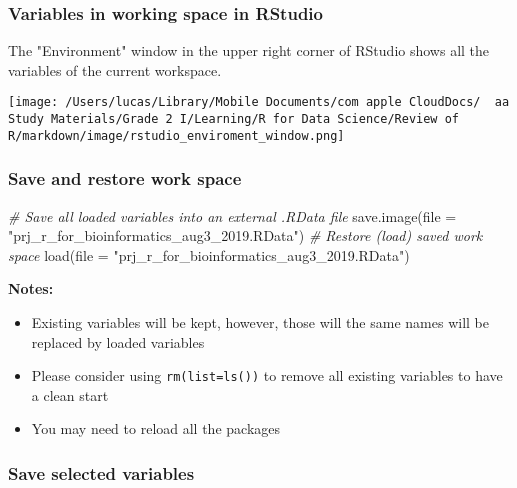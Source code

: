 \documentclass[
]{article}
\let\oldincludegraphics\includegraphics
\renewcommand{\includegraphics}[2][]{\begin{center}\oldincludegraphics[#1]{#2}\end{center}}
\newenvironment{Shaded}{}{}
\newcommand{\AttributeTok}[1]{\textcolor[rgb]{0.49,0.56,0.16}{#1}}
\newcommand{\CommentTok}[1]{\textcolor[rgb]{0.38,0.63,0.69}{\textit{#1}}}
\newcommand{\FunctionTok}[1]{\textcolor[rgb]{0.02,0.16,0.49}{#1}}
\newcommand{\NormalTok}[1]{#1}
\newcommand{\StringTok}[1]{\textcolor[rgb]{0.25,0.44,0.63}{#1}}
\begin{document}
\hypertarget{variables-in-working-space-in-rstudio}{%
\subsubsection{Variables in working space in
RStudio}\label{variables-in-working-space-in-rstudio}}

The "Environment" window in the upper right corner of RStudio shows all
the variables of the current workspace.

\texttt{[image: /Users/lucas/Library/Mobile Documents/com~apple~CloudDocs/~~aa Study Materials/Grade 2 I/Learning/R for Data Science/Review of R/markdown/image/rstudio\_enviroment\_window.png]}

\hypertarget{save-and-restore-work-space}{%
\subsubsection{Save and restore work
space}\label{save-and-restore-work-space}}

\begin{Shaded}
\begin{Highlighting}[]
\CommentTok{\# Save all loaded variables into an external .RData file}
\FunctionTok{save.image}\NormalTok{(}\AttributeTok{file =} \StringTok{"prj\_r\_for\_bioinformatics\_aug3\_2019.RData"}\NormalTok{) }
\CommentTok{\# Restore (load) saved work space}
\FunctionTok{load}\NormalTok{(}\AttributeTok{file =} \StringTok{"prj\_r\_for\_bioinformatics\_aug3\_2019.RData"}\NormalTok{)}
\end{Highlighting}
\end{Shaded}

\textbf{Notes:}

\begin{itemize}
\item
  Existing variables will be kept, however, those will the same names
  will be replaced by loaded variables
\item
  Please consider using \texttt{rm(list=ls())} to remove all existing
  variables to have a clean start
\item
  You may need to reload all the packages
\end{itemize}

\hypertarget{save-selected-variables}{%
\subsubsection{Save selected variables}\label{save-selected-variables}}
\end{document}

